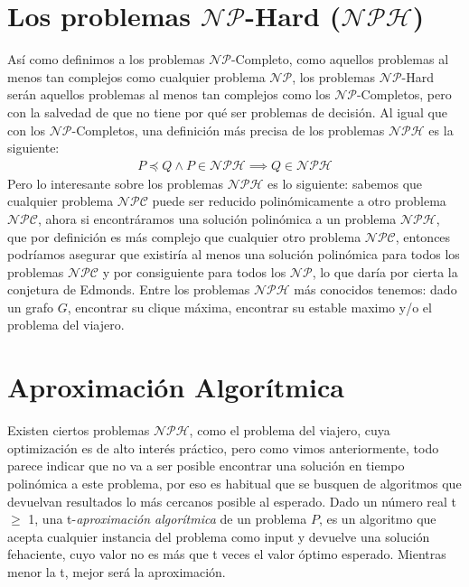 \documentclass{article}
\begin{document}
\section*{Los problemas $\mathcal{NP}$-Hard ($\mathcal{NPH}$)}
Así como definimos a los problemas $\mathcal{NP}$-Completo, como aquellos problemas al menos tan complejos como cualquier problema $\mathcal{NP}$, los problemas $\mathcal{NP}$-Hard serán aquellos problemas al menos tan complejos como los $\mathcal{NP}$-Completos, pero con la salvedad de que no tiene por qué ser problemas de decisión.
Al igual que con los $\mathcal{NP}$-Completos, una definición más precisa de los problemas $\mathcal{NPH}$ es la siguiente:
\begin{align*}
    P \preceq Q \land P \in \mathcal{NPH} \implies Q\in   \mathcal{NPH}
\end{align*}
Pero lo interesante sobre los problemas $\mathcal{NPH}$ es lo siguiente: sabemos que cualquier problema $\mathcal{NPC}$ puede ser reducido polinómicamente a otro problema $\mathcal{NPC}$, ahora si encontráramos una solución polinómica a un problema $\mathcal{NPH}$, que por definición es más complejo que cualquier otro problema $\mathcal{NPC}$, entonces podríamos asegurar que existiría al menos una solución polinómica para todos los problemas $\mathcal{NPC}$ y por consiguiente para todos los $\mathcal{NP}$, lo que daría por cierta la conjetura de Edmonds.\newline
Entre los problemas $\mathcal{NPH}$ más conocidos tenemos: dado un grafo $G$, encontrar su clique máxima, encontrar su estable maximo y/o el problema del viajero.

\section*{Aproximación Algorítmica}
Existen ciertos problemas $\mathcal{NPH}$, como el problema del viajero, cuya optimización es de alto interés práctico, pero como vimos anteriormente, todo parece indicar que no va a ser posible encontrar una solución en tiempo polinómica a este problema, por eso es habitual que se busquen de algoritmos que devuelvan resultados lo más cercanos posible al esperado.\newline
Dado un número real t $\geq$ 1, una t-\textit{aproximación algorítmica} de un problema $P$, es un algoritmo que acepta cualquier instancia del problema como input y devuelve una solución fehaciente, cuyo valor no es más que t veces el valor óptimo esperado. Mientras menor la t, mejor será la aproximación.
\end{document}
